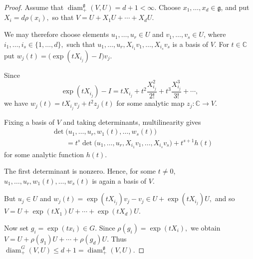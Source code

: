 \documentclass[10pt,a4paper]{amsart}
\newcommand{\C}{\mathbb C}
\begin{document}
\begin{proof}
Assume that $\operatorname{diam}^{\mathfrak g}_{+}(V,U)=d+1<\infty.$
Choose $x_1,\ldots,x_d\in\mathfrak g$, and put $X_i=d\rho(x_i),$
so that $V=U+X_1U+\cdots+X_dU.$

We may therefore choose elements $u_1,\ldots,u_r\in U$
and $v_1,\ldots,v_s\in U$, where $i_1,\ldots,i_s\in\{1,\ldots,d\},$
such that $u_1,\ldots,u_r,
 X_{i_1}v_1,\ldots,X_{i_s}v_s$
is a basis of $V$. For $t\in\C$ put $w_j(t)
 =
 \bigl(\operatorname{exp}(tX_{i_j})-I\bigr)v_j.$
 
Since
\[
 \operatorname{exp}(tX_{i_j})-I
 =
 tX_{i_j}+t^2\frac{X_{i_j}^2}{2!}
 +t^3\frac{X_{i_j}^3}{3!}+\cdots,
\]
we have $w_j(t)
 =
 tX_{i_j}v_j+t^2z_j(t)$
for some analytic map $z_j:\mathbb C\to V$.

Fixing a basis of $V$ and taking determinants, multilinearity gives
\[
\begin{aligned}
 &\det\bigl(
 u_1,\ldots,u_r,
 w_1(t),\ldots,w_s(t)
 \bigr)
\\
 &\qquad =
 t^s
 \det\bigl(
 u_1,\ldots,u_r,
 X_{i_1}v_1,\ldots,X_{i_s}v_s
 \bigr)
 +t^{s+1}h(t)
\end{aligned}
\]
for some analytic function $h(t)$.

The first determinant is nonzero. Hence, for some $t\neq0$, $u_1,\ldots,u_r,
 w_1(t),\ldots,w_s(t)$
is again a basis of $V$.

But $u_j\in U$ and $w_j(t)
 =
 \operatorname{exp}(tX_{i_j})v_j-v_j
 \in
 U+\operatorname{exp}(tX_{i_j})U,$ and so $V
 =
 U+\operatorname{exp}(tX_1)U+\cdots+
 \operatorname{exp}(tX_d)U.$

Now set $g_i=\operatorname{exp}(tx_i)\in G.$
Since $\rho(g_i)=\operatorname{exp}(tX_i),$ we obtain $V
 =
 U+\rho(g_1)U+\cdots+\rho(g_d)U.$
Thus $\operatorname{diam}^{G}_{+}(V,U)
 \leq d+1
 =
 \operatorname{diam}^{\mathfrak g}_{+}(V,U).$
\end{proof}
\end{document}
